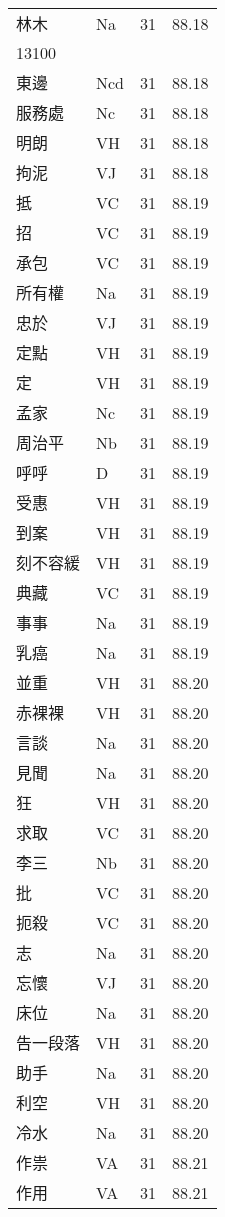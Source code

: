 \documentclass[twocolumn]{book}
\begin{document}
\begin{supertabular}{llrr}
林木 & Na & 31 &  88.18\\
13100\\
東邊 & Ncd & 31 &  88.18\\
服務處 & Nc & 31 &  88.18\\
明朗 & VH & 31 &  88.18\\
拘泥 & VJ & 31 &  88.18\\
抵 & VC & 31 &  88.19\\
招 & VC & 31 &  88.19\\
承包 & VC & 31 &  88.19\\
所有權 & Na & 31 &  88.19\\
忠於 & VJ & 31 &  88.19\\
定點 & VH & 31 &  88.19\\
定 & VH & 31 &  88.19\\
孟家 & Nc & 31 &  88.19\\
周治平 & Nb & 31 &  88.19\\
呼呼 & D & 31 &  88.19\\
受惠 & VH & 31 &  88.19\\
到案 & VH & 31 &  88.19\\
刻不容緩 & VH & 31 &  88.19\\
典藏 & VC & 31 &  88.19\\
事事 & Na & 31 &  88.19\\
乳癌 & Na & 31 &  88.19\\
並重 & VH & 31 &  88.20\\
赤裸裸 & VH & 31 &  88.20\\
言談 & Na & 31 &  88.20\\
見聞 & Na & 31 &  88.20\\
狂 & VH & 31 &  88.20\\
求取 & VC & 31 &  88.20\\
李三 & Nb & 31 &  88.20\\
批 & VC & 31 &  88.20\\
扼殺 & VC & 31 &  88.20\\
志 & Na & 31 &  88.20\\
忘懷 & VJ & 31 &  88.20\\
床位 & Na & 31 &  88.20\\
告一段落 & VH & 31 &  88.20\\
助手 & Na & 31 &  88.20\\
利空 & VH & 31 &  88.20\\
冷水 & Na & 31 &  88.20\\
作祟 & VA & 31 &  88.21\\
作用 & VA & 31 &  88.21\\

\end{supertabular}
\end{document}
